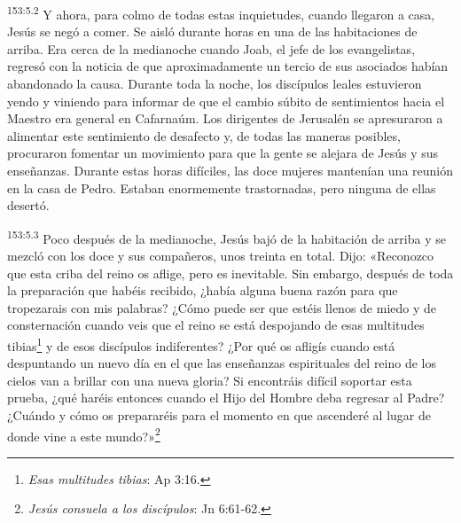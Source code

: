 \par 
\textsuperscript{153:5.2} Y ahora, para colmo de todas estas inquietudes, cuando llegaron a casa, Jesús se negó a comer. Se aisló durante horas en una de las habitaciones de arriba. Era cerca de la medianoche cuando Joab, el jefe de los evangelistas, regresó con la noticia de que aproximadamente un tercio de sus asociados habían abandonado la causa. Durante toda la noche, los discípulos leales estuvieron yendo y viniendo para informar de que el cambio súbito de sentimientos hacia el Maestro era general en Cafarnaúm. Los dirigentes de Jerusalén se apresuraron a alimentar este sentimiento de desafecto y, de todas las maneras posibles, procuraron fomentar un movimiento para que la gente se alejara de Jesús y sus enseñanzas. Durante estas horas difíciles, las doce mujeres mantenían una reunión en la casa de Pedro. Estaban enormemente trastornadas, pero ninguna de ellas desertó.

\par 
\textsuperscript{153:5.3} Poco después de la medianoche, Jesús bajó de la habitación de arriba y se mezcló con los doce y sus compañeros, unos treinta en total. Dijo: «Reconozco que esta criba del reino os aflige, pero es inevitable. Sin embargo, después de toda la preparación que habéis recibido, ¿había alguna buena razón para que tropezarais con mis palabras? ¿Cómo puede ser que estéis llenos de miedo y de consternación cuando veis que el reino se está despojando de esas multitudes tibias\footnote{\textit{Esas multitudes tibias}: Ap 3:16.} y de esos discípulos indiferentes? ¿Por qué os afligís cuando está despuntando un nuevo día en el que las enseñanzas espirituales del reino de los cielos van a brillar con una nueva gloria? Si encontráis difícil soportar esta prueba, ¿qué haréis entonces cuando el Hijo del Hombre deba regresar al Padre? ¿Cuándo y cómo os prepararéis para el momento en que ascenderé al lugar de donde vine a este mundo?»\footnote{\textit{Jesús consuela a los discípulos}: Jn 6:61-62.}

